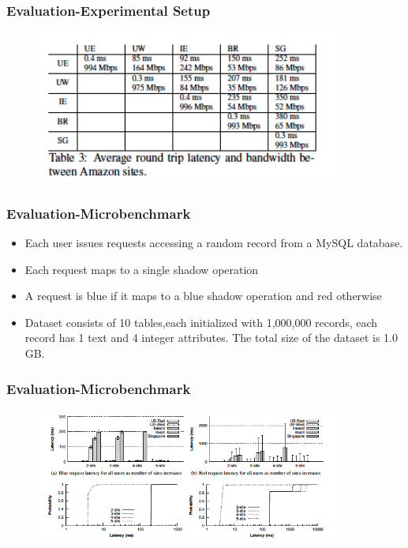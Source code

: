 \documentclass{beamer}
\begin{document}

\begin{frame}
\frametitle{Evaluation-Experimental Setup}
\begin{figure}[t]
\includegraphics[width=10cm]{pic14.jpg}
\centering
\end{figure}
\end{frame}



\begin{frame}
\frametitle{Evaluation-Microbenchmark}
\begin{itemize}
\item Each user issues requests accessing a random record from a MySQL database.
\item Each request maps to a single shadow operation
\item A request is blue if it maps to a blue shadow operation and red otherwise
\item Dataset consists of 10 tables,each initialized with 1,000,000 records, each record has 1 text and 4 integer attributes. The total size of the dataset is 1.0 GB.
\end{itemize}
\end{frame}



\begin{frame}
\frametitle{Evaluation-Microbenchmark}
\begin{figure}[t]
\includegraphics[width=10cm]{pic15.jpg}
\centering
\end{figure}
\end{frame}
\end{document}
